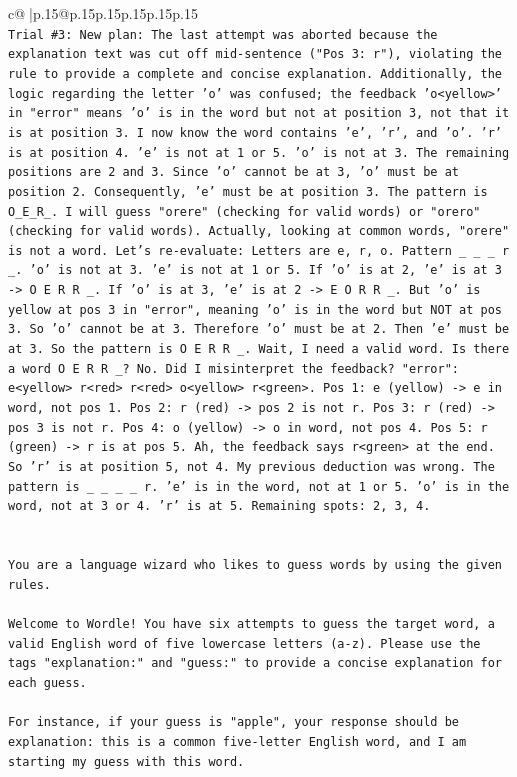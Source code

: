 \documentclass{article}
\begin{document}
{\begin{supertabular}{c@{$\;$}|p{.15\linewidth}@{}p{.15\linewidth}p{.15\linewidth}p{.15\linewidth}p{.15\linewidth}p{.15\linewidth}}
{{{\\ 
\texttt{Trial \#3: New plan: The last attempt was aborted because the explanation text was cut off mid{-}sentence ("Pos 3: r"), violating the rule to provide a complete and concise explanation. Additionally, the logic regarding the letter 'o' was confused; the feedback 'o<yellow>' in "error" means 'o' is in the word but not at position 3, not that it is at position 3. I now know the word contains 'e', 'r', and 'o'. 'r' is at position 4. 'e' is not at 1 or 5. 'o' is not at 3. The remaining positions are 2 and 3. Since 'o' cannot be at 3, 'o' must be at position 2. Consequently, 'e' must be at position 3. The pattern is O\_E\_R\_. I will guess "orere" (checking for valid words) or "orero" (checking for valid words). Actually, looking at common words, "orere" is not a word. Let's re{-}evaluate: Letters are e, r, o. Pattern \_ \_ \_ r \_. 'o' is not at 3. 'e' is not at 1 or 5. If 'o' is at 2, 'e' is at 3 {-}> O E R R \_. If 'o' is at 3, 'e' is at 2 {-}> E O R R \_. But 'o' is yellow at pos 3 in "error", meaning 'o' is in the word but NOT at pos 3. So 'o' cannot be at 3. Therefore 'o' must be at 2. Then 'e' must be at 3. So the pattern is O E R R \_. Wait, I need a valid word. Is there a word O E R R \_? No. Did I misinterpret the feedback? "error": e<yellow> r<red> r<red> o<yellow> r<green>. Pos 1: e (yellow) {-}> e in word, not pos 1. Pos 2: r (red) {-}> pos 2 is not r. Pos 3: r (red) {-}> pos 3 is not r. Pos 4: o (yellow) {-}> o in word, not pos 4. Pos 5: r (green) {-}> r is at pos 5. Ah, the feedback says r<green> at the end. So 'r' is at position 5, not 4. My previous deduction was wrong. The pattern is \_ \_ \_ \_ r. 'e' is in the word, not at 1 or 5. 'o' is in the word, not at 3 or 4. 'r' is at 5. Remaining spots: 2, 3, 4.} \\
\\ 
\\ 
\texttt{You are a language wizard who likes to guess words by using the given rules.} \\
\\ 
\texttt{Welcome to Wordle! You have six attempts to guess the target word, a valid English word of five lowercase letters (a{-}z). Please use the tags "explanation:" and "guess:" to provide a concise explanation for each guess.} \\
\\ 
\texttt{For instance, if your guess is "apple", your response should be} \\
\texttt{explanation: this is a common five{-}letter English word, and I am starting my guess with this word.} \\
}}}
\end{supertabular}}
\end{document}
